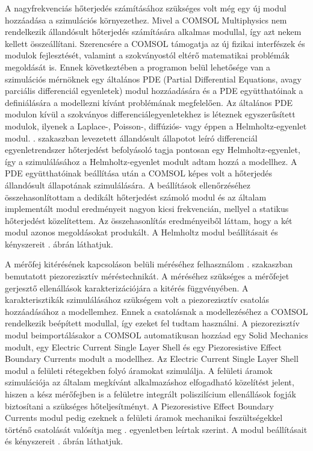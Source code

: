 A nagyfrekvenciás hőterjedés számításához szükséges volt még egy új modul hozzáadása a szimulációs környezethez. Mivel a COMSOL Multiphysics nem rendelkezik állandósult hőterjedés számítására alkalmas modullal, így azt nekem kellett összeállítani. Szerencsére a COMSOL támogatja az új fizikai interfészek és modulok fejlesztését, valamint a szokványostól eltérő matematikai problémák megoldását is. Ennek következtében a programon belül lehetősége van a szimulációs mérnöknek egy általános PDE (Partial Differential Equations, avagy parciális differenciál egyenletek) modul hozzáadására és a PDE együtthatóinak a definiálására a modellezni kívánt problémának megfelelően. Az általános PDE modulon kívül a szokványos differenciálegyenletekhez is léteznek egyszerűsített modulok, ilyenek a Laplace-, Poisson-, diffúziós- vagy éppen a Helmholtz-egyenlet modul. . szakaszban levezetett állandósult állapotot leíró differenciál egyenletrendszer hőterjedést befolyásoló tagja pontosan egy Helmholtz-egyenlet, így a szimulálásához a Helmholtz-egyenlet modult adtam hozzá a modellhez. A PDE együtthatóinak beállítása után a COMSOL képes volt a hőterjedés állandósult állapotának szimulálására. A beállítások ellenőrzéséhez összehasonlítottam a dedikált hőterjedést számoló modul és az általam implementált modul eredményeit nagyon kicsi frekvencián, mellyel a statikus hőterjedést közelítettem. Az összehasonlítás eredményeiből láttam, hogy a két modul azonos megoldásokat produkált. A Helmholtz modul beállításait és kényszereit . ábrán láthatjuk.


A mérőfej kitérésének kapcsoláson belüli méréséhez felhasználom . szakaszban bemutatott piezorezisztív méréstechnikát. A méréséhez szükséges a mérőfejet gerjesztő ellenállások karakterizációjára a kitérés függvényében. A karakterisztikák szimulálásához szükségem volt a piezorezisztív csatolás hozzáadásához a modellemhez. Ennek a csatolásnak a modellezéséhez a COMSOL rendelkezik beépített modullal, így ezeket fel tudtam használni. A piezorezisztív modul beimportálásakor a COMSOL automatikusan hozzáad egy Solid Mechanics modult, egy Electric Current Single Layer Shell és egy Piezoresistive Effect Boundary Currents modult a modellhez. Az Electric Current Single Layer Shell modul a felületi rétegekben folyó áramokat szimulálja. A felületi áramok szimulációja az általam megkívánt alkalmazáshoz elfogadható közelítést jelent, hiszen a kész mérőfejben is a felületre integrált poliszilícium ellenállások fogják biztosítani a szükséges hőteljesítményt. A Piezoresistive Effect Boundary Currents modul pedig ezeknek a felületi áramok mechanikai feszültségekkel történő csatolását valósítja meg . egyenletben leírtak szerint. A modul beállításait és kényszereit . ábrán láthatjuk.

